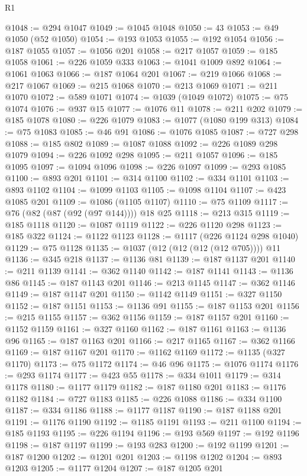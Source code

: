 \begin{lexlean}{R1}
\begin{coremodule}
@1048 := @294 @1047
@1049 := @1045 @1048
@1050 := 43
@1053 := @49 @1050 (@52 @1050)
@1054 := @193 @1053
@1055 := @192 @1054
@1056 := @187 @1055
@1057 := @1056 @201
@1058 := @217 @1057
@1059 := @185 @1058
@1061 := @226 @1059 @333
@1063 := @1041 @1009 @892
@1064 := @1061 @1063
@1066 := @187 @1064 @201
@1067 := @219 @1066
@1068 := @217 @1067
@1069 := @215 @1068
@1070 := @213 @1069
@1071 := @211 @1070
@1072 := @589 @1071
@1074 := @1039 (@1049 @1072)
@1075 := @75 @1074
@1076 := @937 @15
@1077 := @1076 @11
@1078 := @211 @202
@1079 := @185 @1078
@1080 := @226 @1079
@1083 := @1077 (@1080 @199 @313)
@1084 := @75 @1083
@1085 := @46 @91
@1086 := @1076 @1085
@1087 := @727 @298
@1088 := @185 @802
@1089 := @1087 @1088
@1092 := @226 @1089 @298 @1079
@1094 := @226 @1092 @298
@1095 := @211 @1057
@1096 := @185 @1095
@1097 := @1094 @1096
@1098 := @226 @1097
@1099 := @293 @1085
@1100 := @893 @201
@1101 := @314 @1100
@1102 := @334 @1101
@1103 := @893 @1102
@1104 := @1099 @1103
@1105 := @1098 @1104
@1107 := @423 @1085 @201
@1109 := @1086 (@1105 @1107)
@1110 := @75 @1109
@1117 := @76 (@82 (@87 (@92 (@97 @144)))) @18 @25
@1118 := @213 @315
@1119 := @185 @1118
@1120 := @1087 @1119
@1122 := @226 @1120 @298
@1123 := @185 @322
@1124 := @1122 @1123
@1128 := @1117 (@226 @1124 @298 @1040)
@1129 := @75 @1128
@1135 := @1037 (@12 (@12 (@12 (@12 @705)))) @11
@1136 := @345 @218
@1137 := @1136 @81
@1139 := @187 @1137 @201
@1140 := @211 @1139
@1141 := @362 @1140
@1142 := @187 @1141
@1143 := @1136 @86
@1145 := @187 @1143 @201
@1146 := @213 @1145
@1147 := @362 @1146
@1149 := @187 @1147 @201
@1150 := @1142 @1149
@1151 := @327 @1150
@1152 := @187 @1151
@1153 := @1136 @91
@1155 := @187 @1153 @201
@1156 := @215 @1155
@1157 := @362 @1156
@1159 := @187 @1157 @201
@1160 := @1152 @1159
@1161 := @327 @1160
@1162 := @187 @1161
@1163 := @1136 @96
@1165 := @187 @1163 @201
@1166 := @217 @1165
@1167 := @362 @1166
@1169 := @187 @1167 @201
@1170 := @1162 @1169
@1172 := @1135 (@327 @1170)
@1173 := @75 @1172
@1174 := @46 @96
@1175 := @1076 @1174
@1176 := @293 @1174
@1177 := @423 @55
@1178 := @334 @1011
@1179 := @314 @1178
@1180 := @1177 @1179
@1182 := @187 @1180 @201
@1183 := @1176 @1182
@1184 := @727 @1183
@1185 := @226 @1088
@1186 := @334 @1100
@1187 := @334 @1186
@1188 := @1177 @1187
@1190 := @187 @1188 @201
@1191 := @1176 @1190
@1192 := @1185 @1191
@1193 := @211 @1100
@1194 := @185 @1193
@1195 := @226 @1194
@1196 := @193 @569
@1197 := @192 @1196
@1198 := @187 @1197
@1199 := @193 @283
@1200 := @192 @1199
@1201 := @187 @1200
@1202 := @1201 @201
@1203 := @1198 @1202
@1204 := @893 @1203
@1205 := @1177 @1204
@1207 := @187 @1205 @201

\end{coremodule}
\end{lexlean}
